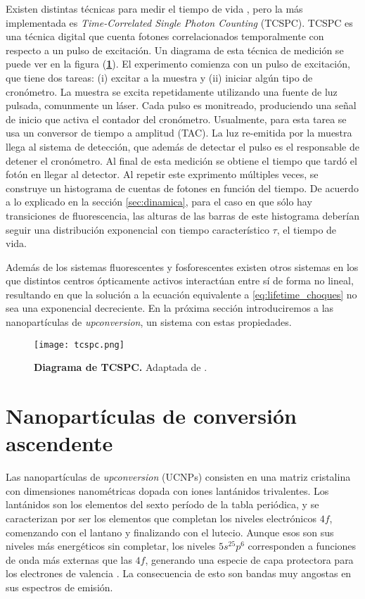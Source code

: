 Existen distintas técnicas para medir el tiempo de vida \cite{becker_fluorescence_2012}, pero la más implementada es \textit{Time-Correlated Single Photon Counting} (TCSPC).
TCSPC es una técnica digital que cuenta fotones correlacionados temporalmente con respecto a un pulso de excitación.
Un diagrama de esta técnica de medición se puede ver en la figura (\textbf{\ref{fig:tcspc}}).
El experimento comienza con un pulso de excitación, que tiene dos tareas: (i) excitar a la muestra y (ii) iniciar algún tipo de cronómetro.
La muestra se excita repetidamente utilizando una fuente de luz pulsada, comunmente un láser.
Cada pulso es monitreado, produciendo una señal de inicio que activa el contador del cronómetro.
Usualmente, para esta tarea se usa un conversor de tiempo a amplitud (TAC).
La luz re-emitida por la muestra llega al sistema de detección, que además de detectar el pulso es el responsable de detener el cronómetro.
Al final de esta medición se obtiene el tiempo que tardó el fotón en llegar al detector.
Al repetir este exprimento múltiples veces, se construye un histograma de cuentas de fotones en función del tiempo.
De acuerdo a lo explicado en la sección \ref{sec:dinamica}, para el caso en que sólo hay transiciones de fluorescencia, las alturas de las barras de este histograma deberían seguir una distribución exponencial con tiempo característico $\tau$, el tiempo de vida.

Además de los sistemas fluorescentes y fosforescentes existen otros sistemas en los que distintos centros ópticamente activos interactúan entre sí de forma no lineal, resultando en que la solución a la ecuación equivalente a \ref{eq:lifetime_choques} no sea una exponencial decreciente.
En la próxima sección introduciremos a las nanopartículas de \textit{upconversion}, un sistema con estas propiedades.


\begin{figure}
    \centering
    \texttt{[image: tcspc.png]}
    \caption{\textbf{Diagrama de TCSPC.} Adaptada de \cite{bujjamer2020}.}
    \label{fig:tcspc}
\end{figure}


\section{Nanopartículas de conversión ascendente} \label{sec:intro_ucnp}

Las nanopartículas de \textit{upconversion} (UCNPs) consisten en una matriz cristalina con dimensiones nanométricas dopada con iones lantánidos trivalentes.
Los lantánidos son los elementos del sexto período de la tabla periódica, y se caracterizan por ser los elementos que completan los niveles electrónicos $4f$, comenzando con el lantano y finalizando con el lutecio.
Aunque esos son sus niveles más energéticos sin completar, los niveles $5s^25p^6$ corresponden a funciones de onda más externas que las $4f$, generando una especie de capa protectora para los electrones de valencia \cite{lanthanides}.
La consecuencia de esto son bandas muy angostas en sus espectros de emisión. 
